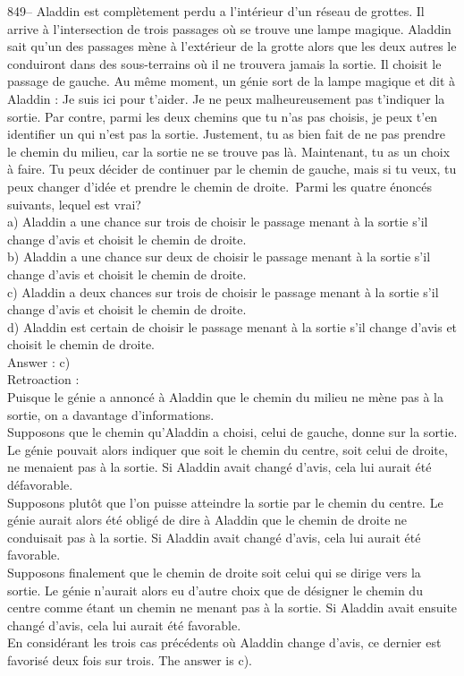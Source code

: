 ﻿\documentclass[letterpaper, 12pt]{article}
\begin{document}
849-- Aladdin est compl\`etement perdu a l'int\'erieur d'un r\'eseau
de grottes.  Il arrive \`a l'intersection de trois passages o\`u se
trouve une lampe magique.  Aladdin sait qu'un des passages m\`ene
\`a l'ext\'erieur de la grotte alors que les deux autres le
conduiront dans des sous-terrains o\`u il ne trouvera jamais la
sortie.  Il choisit le passage de gauche.  Au m\^eme moment, un
g\'enie sort de la lampe magique et dit \`a Aladdin : \og Je suis
ici pour t'aider.  Je ne peux malheureusement pas t'indiquer la
sortie.  Par contre, parmi les deux chemins que tu n'as pas choisis,
je peux t'en identifier un qui n'est pas la sortie.  Justement, tu
as bien fait de ne pas prendre le chemin du milieu, car la sortie ne
se trouve pas l\`a. Maintenant, tu as un choix \`a faire.  Tu peux
d\'ecider de continuer par le chemin de gauche, mais si tu veux, tu
peux changer d'id\'ee et prendre le chemin de droite.\fg\  Parmi les
quatre \'enonc\'es suivants, lequel est
vrai?\\
a) Aladdin a une chance sur trois de choisir le passage menant \`a la sortie
s'il change d'avis et choisit le chemin de droite. \\
b) Aladdin a une chance sur deux de choisir le passage menant \`a la sortie
s'il change d'avis et choisit le chemin de droite.\\
c) Aladdin a deux chances sur trois de choisir le passage menant \`a la
sortie s'il change d'avis et choisit le chemin de droite.\\
d) Aladdin est certain de choisir le passage menant \`a la sortie s'il
change d'avis et choisit le chemin de droite.\\

Answer : c)\\

Retroaction : \\
Puisque le g\'enie a annonc\'e \`a Aladdin que le chemin du milieu ne m\`ene
pas \`a la sortie, on a davantage d'informations.\\
Supposons que le chemin qu'Aladdin a choisi, celui de gauche, donne
sur la sortie. Le g\'enie pouvait alors indiquer que soit le chemin
du centre, soit celui de droite, ne menaient pas \`a la sortie. Si
Aladdin avait chang\'e d'avis, cela lui aurait \'et\'e
d\'efavorable.\\
Supposons plut\^ot que l'on puisse atteindre la sortie par le chemin du
centre. Le g\'enie aurait alors \'et\'e oblig\'e de dire \`a Aladdin que le
chemin de droite ne conduisait pas \`a la sortie. Si Aladdin avait chang\'e
d'avis, cela lui aurait \'et\'e favorable.\\
Supposons finalement que le chemin de droite soit celui qui se dirige vers
la sortie. Le g\'enie n'aurait alors eu d'autre choix que de d\'esigner le
chemin du centre comme \'etant un chemin ne menant pas \`a la sortie. Si
Aladdin avait ensuite chang\'e d'avis, cela lui aurait \'et\'e favorable.\\
En consid\'erant les trois cas pr\'ec\'edents o\`u Aladdin change d'avis, ce
dernier est favoris\'e deux fois sur trois. The answer is c).\\
\end{document}
